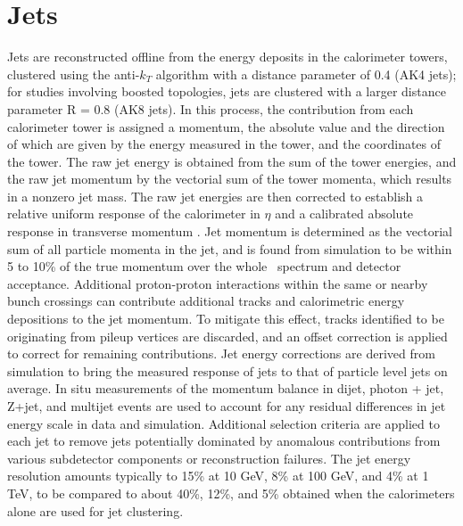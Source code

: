 \section{Jets}
Jets are reconstructed offline from the energy deposits in the calorimeter towers, clustered using the anti-$k_T$ algorithm with a distance parameter of 0.4 (AK4 jets); for studies involving boosted topologies, jets are clustered with a larger distance parameter R = 0.8 (AK8 jets). In this process, the contribution from each calorimeter tower is assigned a momentum, the absolute value and the direction of which are given by the energy measured in the tower, and the coordinates of the tower. The raw jet energy is obtained from the sum of the tower energies, and the raw jet momentum by the vectorial sum of the tower momenta, which results in a nonzero jet mass. The raw jet energies are then corrected to establish a relative uniform response of the calorimeter in $\eta$ and a calibrated absolute response in transverse momentum \pt. Jet momentum is determined as the vectorial sum of all particle momenta in the jet, and is found from simulation to be within 5 to 10\% of the true momentum over the whole \pt\ spectrum and detector acceptance. Additional proton-proton interactions within the same or nearby bunch crossings can contribute additional tracks and calorimetric energy depositions to the jet momentum. To mitigate this effect, tracks identified to be originating from pileup vertices are discarded, and an offset correction is applied to correct for remaining contributions. Jet energy corrections are derived from simulation to bring the measured response of jets to that of particle level jets on average. In situ measurements of the momentum balance in dijet, photon + jet, Z+jet, and multijet events are used to account for any residual differences in jet energy scale in data and simulation. Additional selection criteria are applied to each jet to remove jets potentially dominated by anomalous contributions from various subdetector components or reconstruction failures. The jet energy resolution amounts typically to 15\% at 10 GeV, 8\% at 100 GeV, and 4\% at 1 TeV, to be compared to about 40\%, 12\%, and 5\% obtained when the calorimeters alone are used for jet clustering.
